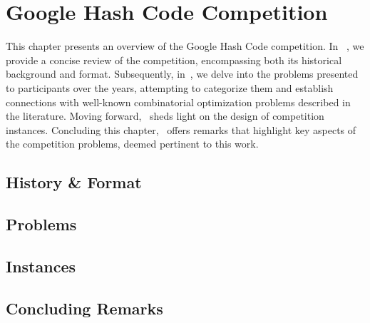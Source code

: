 \chapter{Google Hash Code Competition}
\label{ch:hashcode-problems}


This chapter presents an overview of the Google Hash Code competition. In
~, we provide a concise review of the competition,
encompassing both its historical background and format. Subsequently,
in~, we delve into the problems presented to
participants over the years, attempting to categorize them and establish
connections with well-known combinatorial optimization problems described in the
literature. Moving forward,~ sheds light on the
design of competition instances. Concluding this
chapter,~ offers remarks that highlight key aspects
of the competition problems, deemed pertinent to this work.

\section{History \& Format}
\label{sec:hashcode-format}


\section{Problems}
\label{sec:hashcode-problems}


\section{Instances}
\label{sec:hashcode-instances}


\section{Concluding Remarks}
\label{sec:hashcode-remarks}
